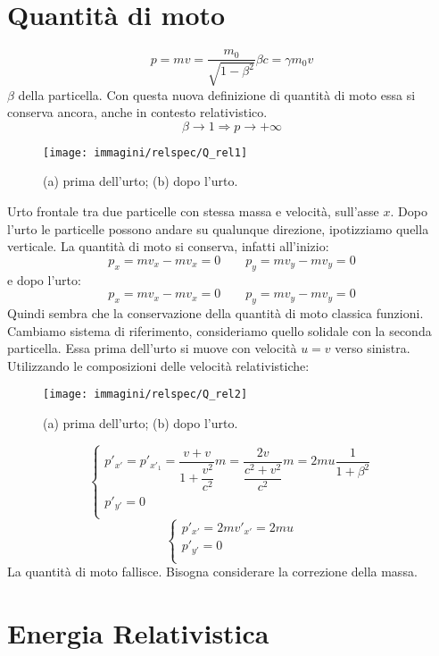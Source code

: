 \section{Quantità di moto}
\[p=mv=\frac{m_0}{\sqrt{1-\beta^2}}\beta c=\gamma m_0 v\]
$\beta$ della particella. Con questa nuova definizione di quantità di moto essa si conserva ancora, anche in contesto relativistico.
\[\beta\rightarrow 1\Rightarrow p\rightarrow +\infty\]

\begin{Es}
\begin{figure}[htbp]
   \centering
   \texttt{[image: immagini/relspec/Q\_rel1]}
   \caption{(a) prima dell'urto; (b) dopo l'urto.}
\end{figure}
Urto frontale tra due particelle con stessa massa e velocità, sull'asse $x$. Dopo l'urto le particelle possono andare su qualunque direzione, ipotizziamo quella verticale. La quantità di moto si conserva, infatti all'inizio:
\[p_x=mv_x-mv_x=0\qquad p_y=mv_y-mv_y=0\]
e dopo l'urto:
\[p_x=mv_x-mv_x=0\qquad p_y=mv_y-mv_y=0\]
Quindi sembra che la conservazione della quantità di moto classica funzioni. Cambiamo sistema di riferimento, 
consideriamo quello solidale con la seconda particella. Essa prima dell'urto si muove con velocità $u=v$ verso sinistra. 
Utilizzando le composizioni delle velocità relativistiche:
\begin{figure}[htbp]
   \centering
   \texttt{[image: immagini/relspec/Q\_rel2]}
   \caption{(a) prima dell'urto; (b) dopo l'urto.}
\end{figure}

\[\left\{
\begin{array}{l}
p'_{x'}=p'_{x'_1}=\dfrac{v+v}{1+\dfrac{v^2}{c^2}}m=\dfrac{2v}{\dfrac{c^2+v^2}{c^2}}m=2mu\dfrac{1}{1+\beta^2}\\
p'_{y'}=0\\
\end{array}
\right. \]
\[\left\{
\begin{array}{l}
p'_{x'}=2mv'_{x'}=2mu\\
p'_{y'}=0\\
\end{array}
\right. \]
La quantità di moto fallisce. Bisogna considerare la correzione della massa.
\end{Es}
\section{Energia Relativistica}
\label{energia_cinetica_relativistica}

